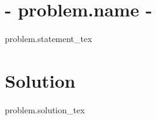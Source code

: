 \documentclass[11pt]{article}
\begin{document}
\section*{ {{- problem.name -}} }

\begin{problems}

    \item[] %

{{ problem.statement_tex }} %

\end{problems}

\section*{Solution}

\begin{problems}

    \item[] %

{{ problem.solution_tex }} %

\end{problems}
\end{document}
